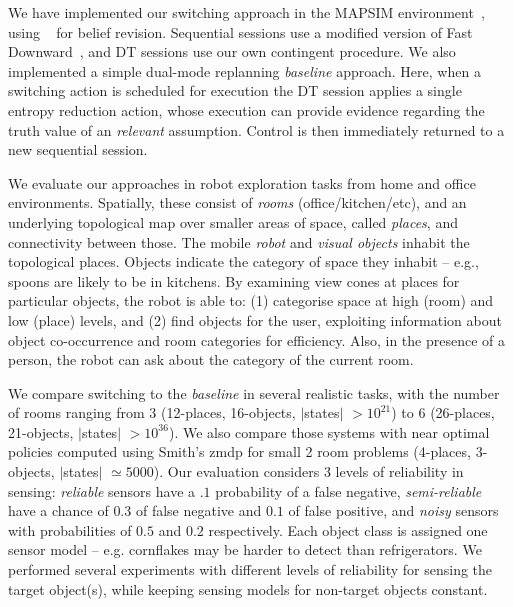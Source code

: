 
We have implemented our switching approach in the MAPSIM
environment~\cite{brenner:nebel:jaamas09},
using ~\cite{king:2009} for belief
revision. Sequential sessions use a modified version of Fast
Downward~\cite{fast-downward}, and DT sessions use our own contingent
procedure. We also implemented a simple dual-mode replanning {\em
baseline} approach. Here, when a switching action is scheduled for
execution the DT session applies a single entropy reduction action,
whose execution can provide evidence regarding the truth value of an
{\em relevant} assumption.
Control is then immediately
returned to a new sequential session.


We evaluate our approaches in robot exploration tasks from home and
office environments. Spatially, these consist of {\em rooms}
(office/kitchen/etc), and an underlying topological map over
smaller areas of space, called {\em places}, and connectivity between
those. The mobile {\em robot} and {\em visual objects} inhabit the
topological places. Objects indicate the category of space they
inhabit -- e.g., spoons are likely to be in kitchens. By examining
view cones at places for particular objects, the robot is able to: (1)
categorise space at high (room) and low (place) levels, and (2) find
objects for the user, exploiting information about object
co-occurrence and room categories for efficiency. Also, in the
presence of a person, the robot can ask about the category of the
current room.


We compare switching to the {\em baseline} in several realistic
tasks, with the number of rooms ranging from 3 (12-places, 16-objects,
$|$states$|$ $>10^{21}$) to 6 (26-places, 21-objects, $|$states$|$
$>10^{36}$). We also compare those systems with near optimal policies
computed using Smith's {\sc zmdp} for small 2 room problems (4-places,
3-objects, $|$states$|$ $\simeq 5000$). Our evaluation considers 3
levels of reliability in sensing: {\em reliable} sensors have a $.1$
probability of a false negative, {\em semi-reliable} have a chance of
$0.3$ of false negative and $0.1$ of false positive, and {\em noisy}
sensors with probabilities of $0.5$ and $0.2$ respectively. Each
object class is assigned one sensor model -- e.g. cornflakes may be
harder to detect than refrigerators. We performed several experiments
with different levels of reliability for sensing the target object(s),
while keeping sensing models for non-target objects constant.

